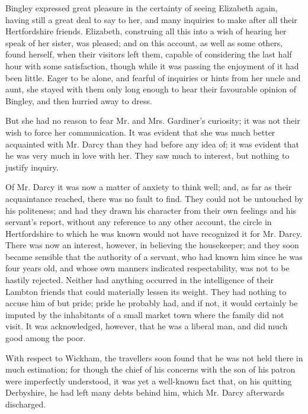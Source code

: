 Bingley expressed great pleasure in the certainty of seeing Elizabeth again, having still a great deal to say to her, and many inquiries to make after all their Hertfordshire friends. Elizabeth, construing all this into a wish of hearing her speak of her sister, was pleased; and on this account, as well as some others, found herself, when their visitors left them, capable of considering the last half hour with some satisfaction, though while it was passing the enjoyment of it had been little. Eager to be alone, and fearful of inquiries or hints from her uncle and aunt, she stayed with them only long enough to hear their favourable opinion of Bingley, and then hurried away to dress.

But she had no reason to fear Mr. and Mrs. Gardiner's curiosity; it was not their wish to force her communication. It was evident that she was much better acquainted with Mr. Darcy than they had before any idea of; it was evident that he was very much in love with her. They saw much to interest, but nothing to justify inquiry.

Of Mr. Darcy it was now a matter of anxiety to think well; and, as far as their acquaintance reached, there was no fault to find. They could not be untouched by his politeness; and had they drawn his character from their own feelings and his servant's report, without any reference to any other account, the circle in Hertfordshire to which he was known would not have recognized it for Mr. Darcy. There was now an interest, however, in believing the housekeeper; and they soon became sensible that the authority of a servant, who had known him since he was four years old, and whose own manners indicated respectability, was not to be hastily rejected. Neither had anything occurred in the intelligence of their Lambton friends that could materially lessen its weight. They had nothing to accuse him of but pride; pride he probably had, and if not, it would certainly be imputed by the inhabitants of a small market town where the family did not visit. It was acknowledged, however, that he was a liberal man, and did much good among the poor.

With respect to Wickham, the travellers soon found that he was not held there in much estimation; for though the chief of his concerns with the son of his patron were imperfectly understood, it was yet a well-known fact that, on his quitting Derbyshire, he had left many debts behind him, which Mr. Darcy afterwards discharged.

